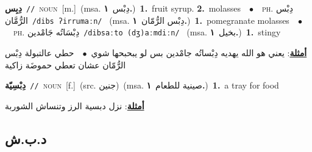 \documentclass[10pt,a4paper,twoside]{article} %
\begin{document}
\begin{multicols}{2}
{{{{\setlength\topsep{0pt}\textbf{\foreignlanguage{arabic}{دِبِس}}\ {\color{gray}\texttt{//}\color{black}}\ \textsc{noun}\ [m.]\ \color{gray}(msa. \foreignlanguage{arabic}{دِبْس}~\foreignlanguage{arabic}{\textbf{١.}})\color{black}\ \textbf{1.}~fruit syrup.  \textbf{2.}~molasses\ \ $\bullet$\ \ \textsc{ph.} \color{gray} \foreignlanguage{arabic}{دِبْس الرُّمَّان}\color{black}\ {\color{gray}\texttt{/{\sffamily dibs ʔirrumaːn}/}\color{black}}\ \color{gray} (msa. \foreignlanguage{arabic}{دِبْس الرُّمّان}~\foreignlanguage{arabic}{\textbf{١.}})\color{black}\ \textbf{1.}~pomegranate molasses\ \ $\bullet$\ \ \textsc{ph.} \color{gray} \foreignlanguage{arabic}{دِبْسَاتُه جَامْدين}\color{black}\ {\color{gray}\texttt{/{\sffamily dibsaːto (dʒ)aːmdiːn}/}\color{black}}\ \color{gray} (msa. \foreignlanguage{arabic}{بخيل}~\foreignlanguage{arabic}{\textbf{١.}})\color{black}\ \textbf{1.}~stingy\  \begin{flushright}\color{gray}\foreignlanguage{arabic}{\textbf{\underline{\foreignlanguage{arabic}{أمثلة}}}: يعني هو الله يهديه دِبْساتُه جامْدين بس لو يبحبحها شوي\ $\bullet$\ \  حطي عالتبولة دِبْس الرُّمّان عشان تعطي حموضَة زاكية}\end{flushright}\color{black}} \vspace{2mm}

{\setlength\topsep{0pt}\textbf{\foreignlanguage{arabic}{دِبْسِيّة}}\ {\color{gray}\texttt{//}\color{black}}\ \textsc{noun}\ [f.]\ (src. \color{gray}\foreignlanguage{arabic}{جنين}\color{black})\ \color{gray}(msa. \foreignlanguage{arabic}{صينية للطعام}~\foreignlanguage{arabic}{\textbf{١.}})\color{black}\ \textbf{1.}~a tray for food\  \begin{flushright}\color{gray}\foreignlanguage{arabic}{\textbf{\underline{\foreignlanguage{arabic}{أمثلة}}}: نزل دبسية الرز وتنساش الشوربة}\end{flushright}\color{black}} \vspace{2mm}

\vspace{-3mm}
\subsection*{\color{blue}\foreignlanguage{arabic}{د.ب.ش}\color{blue}{}} 

}}}
\end{multicols}
\end{document}
